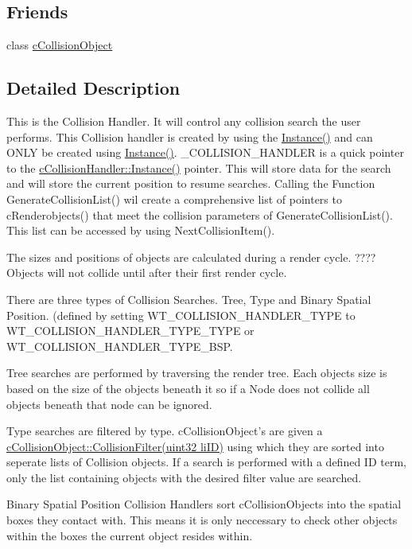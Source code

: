 \subsection*{Friends}
\begin{DoxyCompactItemize}
\item 
\hypertarget{classc_collision_handler_a3fc30c810c62135f498c47205c853e30}{
class \hyperlink{classc_collision_handler_a3fc30c810c62135f498c47205c853e30}{cCollisionObject}}
\label{classc_collision_handler_a3fc30c810c62135f498c47205c853e30}

\end{DoxyCompactItemize}


\subsection{Detailed Description}
This is the Collision Handler. It will control any collision search the user performs. This Collision handler is created by using the \hyperlink{classc_collision_handler_a04d5c8d5b7ac854b4958dca195bf1c1b}{Instance()} and can ONLY be created using \hyperlink{classc_collision_handler_a04d5c8d5b7ac854b4958dca195bf1c1b}{Instance()}. \_\-COLLISION\_\-HANDLER is a quick pointer to the \hyperlink{classc_collision_handler_a04d5c8d5b7ac854b4958dca195bf1c1b}{cCollisionHandler::Instance()} pointer. This will store data for the search and will store the current position to resume searches. Calling the Function GenerateCollisionList() wil create a comprehensive list of pointers to cRenderobjects() that meet the collision parameters of GenerateCollisionList(). This list can be accessed by using NextCollisionItem(). 

The sizes and positions of objects are calculated during a render cycle. ????Objects will not collide until after their first render cycle.

There are three types of Collision Searches. Tree, Type and Binary Spatial Position. (defined by setting WT\_\-COLLISION\_\-HANDLER\_\-TYPE to WT\_\-COLLISION\_\-HANDLER\_\-TYPE\_\-TYPE or WT\_\-COLLISION\_\-HANDLER\_\-TYPE\_\-BSP.

Tree searches are performed by traversing the render tree. Each objects size is based on the size of the objects beneath it so if a Node does not collide all objects beneath that node can be ignored.

Type searches are filtered by type. cCollisionObject's are given a \hyperlink{classc_collision_object_a2a527f445a899adafbf18dddf140e179}{cCollisionObject::CollisionFilter(uint32 liID)} using which they are sorted into seperate lists of Collision objects. If a search is performed with a defined ID term, only the list containing objects with the desired filter value are searched.

Binary Spatial Position Collision Handlers sort cCollisionObjects into the spatial boxes they contact with. This means it is only neccessary to check other objects within the boxes the current object resides within. 